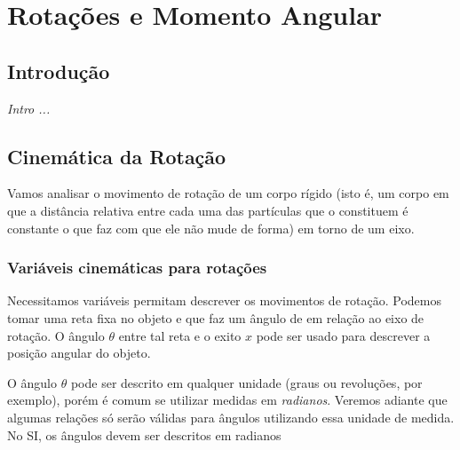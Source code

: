 \chapter{Rotações e Momento Angular}\label{Chap:Rotacoes}



\section{Introdução}

{\it
Intro ...
}

\section{Cinemática da Rotação}

Vamos analisar o movimento de rotação de um corpo rígido (isto é, um corpo em que a distância relativa entre cada uma das partículas que o constituem é constante o que faz com que ele não mude de forma) em torno de um eixo.

\subsection{Variáveis cinemáticas para rotações}

Necessitamos variáveis permitam descrever os movimentos de rotação. Podemos tomar uma reta fixa no objeto e que faz um ângulo de  em relação ao eixo de rotação. O ângulo $\theta$ entre tal reta e o exito $x$ pode ser usado para descrever a posição angular do objeto.


O ângulo $\theta$ pode ser descrito em qualquer unidade (graus ou revoluções, por exemplo), porém é comum se utilizar medidas em \emph{radianos}. Veremos adiante que algumas relações só serão válidas para ângulos utilizando essa unidade de medida. No SI, os ângulos devem ser descritos em radianos

